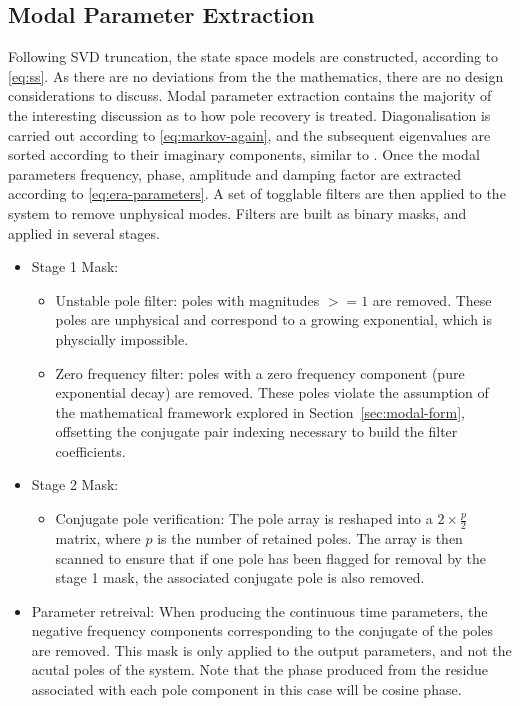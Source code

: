\subsection{Modal Parameter Extraction}
\label{sec:modal}
Following SVD truncation, the state space models are constructed, according to \eqref{eq:ss}. As there are no deviations from the the mathematics, there are no design considerations to discuss. Modal parameter extraction contains the majority of the interesting discussion as to how pole recovery is treated.
Diagonalisation is carried out according to \eqref{eq:markov-again}, and the subsequent eigenvalues are sorted according to their imaginary components, similar to \cite{pyyeti}.
Once the modal parameters frequency, phase, amplitude and damping factor are extracted according to \eqref{eq:era-parameters}. A set of togglable filters are then applied to the system to remove unphysical modes. Filters are built as binary masks, and applied in several stages.
\begin{itemize}
    \item Stage 1 Mask:
    \begin{itemize}
        \item Unstable pole filter: poles with magnitudes $>=1$ are removed. These poles are unphysical and correspond to a growing exponential, which is physcially impossible.
        \item Zero frequency filter: poles with a zero frequency component (pure exponential decay) are removed. These poles violate the assumption of the mathematical framework explored in Section~\ref{sec:modal-form}, offsetting the conjugate pair indexing necessary to build the filter coefficients.
    \end{itemize}
    \item Stage 2 Mask:
    \begin{itemize}
        \item Conjugate pole verification: The pole array is reshaped into a $2\times\frac{p}{2}$ matrix, where $p$ is the number of retained poles. The array is then scanned to ensure that if one pole has been flagged for removal by the stage 1 mask, the associated conjugate pole is also removed.
    \end{itemize}
    \item Parameter retreival: When producing the continuous time parameters, the negative frequency components corresponding to the conjugate of the poles are removed. This mask is only applied to the output parameters, and not the acutal poles of the system. Note that the phase produced from the residue associated with each pole component in this case will be cosine phase.
\end{itemize}

